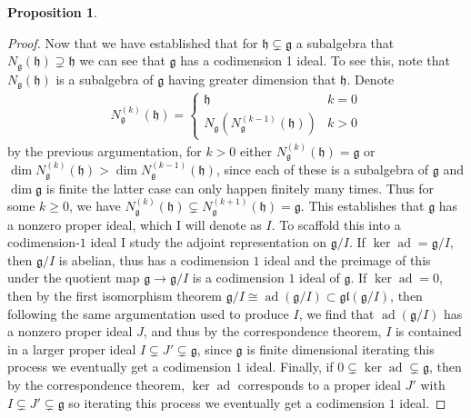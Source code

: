 \documentclass[10.5pt]{article}
\theoremstyle{definition}
\newtheorem{proposition}{Proposition}
\numberwithin{example}{subsection}
\numberwithin{proposition}{subsection}
\numberwithin{pb}{subsection}
\begin{document}
\begin{proposition}
\begin{proof}
                Now that we have established that for \(\mathfrak{h} \subsetneq \mathfrak{g}\) a subalgebra that \(N_\mathfrak{g}(\mathfrak{h}) \supsetneq \mathfrak{h}\) we can see that \(\mathfrak{g}\) has a codimension 1 ideal. To see this, note that \(N_\mathfrak{g}(\mathfrak{h})\) is a subalgebra of \(\mathfrak{g}\) having greater dimension that \(\mathfrak{h}\). Denote
                \begin{align}
                    N^{(k)}_{\mathfrak{g}}(\mathfrak{h}) = \begin{cases}
                        \mathfrak{h} & k = 0 \\
                        N_\mathfrak{g}(N^{(k-1)}_{\mathfrak{g}}(\mathfrak{h})) & k > 0
                    \end{cases}
                \end{align}
                by the previous argumentation, for \(k > 0\) either \(N^{(k)}_\mathfrak{g}(\mathfrak{h}) = \mathfrak{g}\) or \(\dim N^{(k)}_\mathfrak{g}(\mathfrak{h}) > \dim N^{(k-1)}_\mathfrak{g}(\mathfrak{h})\), since each of these is a subalgebra of \(\mathfrak{g}\) and \(\dim \mathfrak{g}\) is finite the latter case can only happen finitely many times. Thus for some \(k \geq 0\), we have \(N_\mathfrak{g}^{(k)}(\mathfrak{h}) \subsetneq N_\mathfrak{g}^{(k+1)}(\mathfrak{h}) = \mathfrak{g}\). This establishes that \(\mathfrak{g}\) has a nonzero proper ideal, which I will denote as \(I\). To scaffold this into a codimension-\(1\) ideal I study the adjoint representation on \(\mathfrak{g}/I\). If \(\ker \operatorname{ad} = \mathfrak{g}/I\), then \(\mathfrak{g}/I\) is abelian, thus has a codimension \(1\) ideal and the preimage of this under the quotient map \(\mathfrak{g} \to \mathfrak{g}/I\) is a codimension \(1\) ideal of \(\mathfrak{g}\). If \(\ker \operatorname{ad} = 0\), then by the first isomorphism theorem \(\mathfrak{g}/I \cong \operatorname{ad}(\mathfrak{g}/I) \subset \mathfrak{gl}(\mathfrak{g}/I)\), then following the same argumentation used to produce \(I\), we find that \(\operatorname{ad}(\mathfrak{g}/I)\) has a nonzero proper ideal \(J\), and thus by the correspondence theorem, \(I\) is contained in a larger proper ideal \(I \subsetneq J' \subsetneq \mathfrak{g}\), since \(\mathfrak{g}\) is finite dimensional iterating this process we eventually get a codimension \(1\) ideal. Finally, if \(0 \subsetneq \ker \operatorname{ad} \subsetneq \mathfrak{g}\), then by the correspondence theorem, \(\ker \operatorname{ad}\) corresponds to a proper ideal \(J'\) with \(I \subsetneq J' \subsetneq \mathfrak{g}\) so iterating this process we eventually get a codimension \(1\) ideal.


\end{proof}
\end{proposition}
\end{document}
